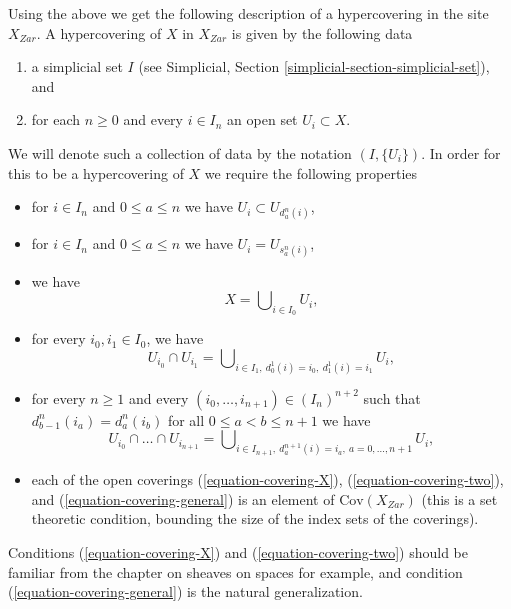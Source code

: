 \documentclass{stacks-project}
\theoremstyle{plain}
\theoremstyle{definition}
\theoremstyle{remark}
\numberwithin{equation}{subsection}
\begin{document}
\medskip\noindent
Using the above we get the following description of a hypercovering
in the site $X_{Zar}$. A hypercovering of $X$ in $X_{Zar}$
is given by the following data
\begin{enumerate}
\item a simplicial set $I$ (see
Simplicial, Section \ref{simplicial-section-simplicial-set}), and
\item for each $n \geq 0$ and every $i \in I_n$ an open set $U_i \subset X$.
\end{enumerate}
We will denote such a collection of data by the notation $(I, \{U_i\})$.
In order for this to be a hypercovering of $X$ we require
the following properties
\begin{itemize}
\item for $i \in I_n$ and $0 \leq a \leq n$
we have $U_i \subset U_{d^n_a(i)}$,
\item for $i \in I_n$ and $0 \leq a \leq n$ we have $U_i = U_{s^n_a(i)}$,
\item we have
\begin{equation}
\label{equation-covering-X}
X = \bigcup\nolimits_{i \in I_0} U_i,
\end{equation}
\item for every $i_0, i_1 \in I_0$, we have
\begin{equation}
\label{equation-covering-two}
U_{i_0} \cap U_{i_1} =
\bigcup\nolimits_{i \in I_1, \ d^1_0(i) = i_0, \ d^1_1(i) = i_1} U_i,
\end{equation}
\item for every $n \geq 1$ and every
$(i_0, \ldots, i_{n + 1}) \in (I_n)^{n + 2}$ such that
$d^n_{b - 1}(i_a) = d^n_a(i_b)$ for all $0\leq a < b\leq n + 1$
we have
\begin{equation}
\label{equation-covering-general}
U_{i_0} \cap \ldots \cap U_{i_{n + 1}} =
\bigcup\nolimits_{i \in I_{n + 1},
\ d^{n + 1}_a(i) = i_a, \ a = 0, \ldots, n + 1} U_i,
\end{equation}
\item each of the open coverings (\ref{equation-covering-X}),
(\ref{equation-covering-two}), and (\ref{equation-covering-general})
is an element of $\text{Cov}(X_{Zar})$
(this is a set theoretic condition, bounding
the size of the index sets of the coverings).
\end{itemize}
Conditions (\ref{equation-covering-X}) and
(\ref{equation-covering-two}) should be familiar from the
chapter on sheaves on spaces for example, and condition
(\ref{equation-covering-general}) is the natural generalization.
\end{document}
